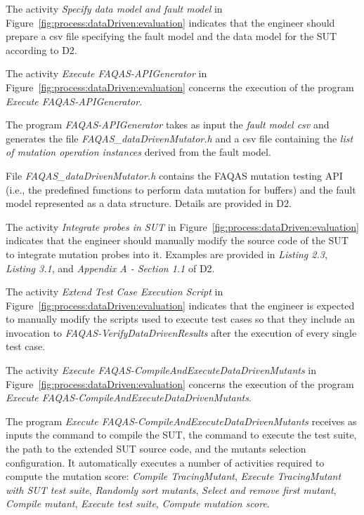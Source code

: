 The activity \emph{Specify data model and fault model} in Figure~\ref{fig:process:dataDriven:evaluation} indicates that the engineer should prepare a csv file specifying the fault model and the data model for the SUT according to D2.

The activity \emph{Execute FAQAS-APIGenerator} in Figure~\ref{fig:process:dataDriven:evaluation} concerns the execution of the program \emph{Execute FAQAS-APIGenerator}.

The program \emph{FAQAS-APIGenerator} takes as input the \emph{fault model csv} and generates the file \emph{FAQAS\_dataDrivenMutator.h} and a csv file containing the \emph{list of mutation operation instances} derived from the fault model.

File \emph{FAQAS\_dataDrivenMutator.h} contains the FAQAS mutation testing API (i.e., the predefined functions to perform data mutation for buffers) and the fault model represented as a data structure. Details are provided in D2.

The activity \emph{Integrate probes in SUT} in Figure~\ref{fig:process:dataDriven:evaluation} indicates that the engineer should manually modify the source code of the SUT to integrate mutation probes into it. Examples are provided in \emph{Listing 2.3}, \emph{Listing 3.1}, and \emph{Appendix A - Section 1.1} of D2. 

The activity \emph{Extend Test Case Execution Script} in Figure~\ref{fig:process:dataDriven:evaluation} indicates that the engineer is expected to manually modify the scripts used to execute test cases so that they include an invocation to \emph{FAQAS-VerifyDataDrivenResults} after the execution of every single test case. 

The activity \emph{Execute FAQAS-CompileAndExecuteDataDrivenMutants} in Figure~\ref{fig:process:dataDriven:evaluation} concerns the execution of the program \emph{Execute FAQAS-CompileAndExecuteDataDrivenMutants}.

The program \emph{Execute FAQAS-CompileAndExecuteDataDrivenMutants} receives as inputs the command to compile the SUT, the command to execute the test suite, the path to the extended SUT source code, and the mutants selection configuration. It automatically executes a number of activities required to compute the mutation score: \emph{Compile TracingMutant}, \emph{Execute TracingMutant with SUT test suite}, \emph{Randomly sort mutants}, \emph{Select and remove first mutant}, \emph{Compile mutant}, \emph{Execute test suite},  \emph{Compute mutation score}.

